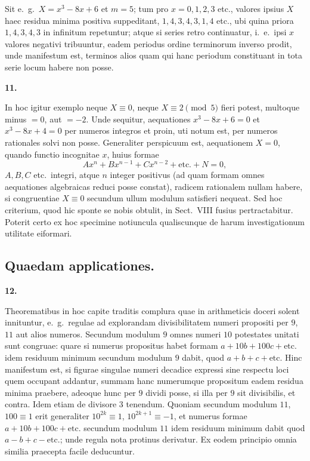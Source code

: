 \documentclass[12pt,a4paper]{article}
\theoremstyle{plain}
\theoremstyle{definition}
\theoremstyle{remark}
\begin{document}
Sit e.~g.\ $X = x^3 - 8x + 6$ et $m = 5$; tum pro $x = 0, 1, 2, 3$ etc., valores ipsius $X$ haec residua minima positiva suppeditant, $1, 4, 3, 4, 3, 1, 4$ etc., ubi quina priora $1, 4, 3, 4, 3$ in infinitum repetuntur; atque si series retro continuatur, i.~e.\ ipsi $x$ valores negativi tribuuntur, eadem periodus ordine terminorum inverso prodit, unde manifestum est, terminos alios quam qui hanc periodum constituant in tota serie locum habere non posse.

\textbf{11.}

In hoc igitur exemplo neque $X \equiv 0$, neque $X \equiv 2 \pmod{5}$ fieri potest, multoque minus $= 0$, aut $= -2$. Unde sequitur, aequationes $x^3 - 8x + 6 = 0$ et $x^3 - 8x + 4 = 0$ per numeros integros et proin, uti notum est, per numeros rationales solvi non posse. Generaliter perspicuum est, aequationem $X = 0$, quando functio incognitae $x$, huius formae
\[
Ax^n + Bx^{n-1} + Cx^{n-2} + \text{etc.} + N = 0,
\]
$A, B, C$ etc.\ integri, atque $n$ integer positivus (ad quam formam omnes aequationes algebraicas reduci posse constat), radicem rationalem nullam habere, si congruentiae $X \equiv 0$ secundum ullum modulum satisfieri nequeat. Sed hoc criterium, quod hic sponte se nobis obtulit, in Sect.~VIII fusius pertractabitur. Poterit certo ex hoc specimine notiuncula qualiscunque de harum investigationum utilitate eiformari.

\vspace{0.5em}
\subsection*{Quaedam applicationes.}

\textbf{12.}

Theorematibus in hoc capite traditis complura quae in arithmeticis doceri solent innituntur, e.~g.\ regulae ad explorandam divisibilitatem numeri propositi per $9$, $11$ aut alios numeros. Secundum modulum $9$ omnes numeri $10$ potestates unitati sunt congruae: quare si numerus propositus habet formam $a + 10b + 100c + \text{etc.}$ idem residuum minimum secundum modulum $9$ dabit, quod $a + b + c + \text{etc.}$ Hinc manifestum est, si figurae singulae numeri decadice expressi sine respectu loci quem occupant addantur, summam hanc numerumque propositum eadem residua minima praebere, adeoque hunc per $9$ dividi posse, si illa per $9$ sit divisibilis, et contra. Idem etiam de divisore $3$ tenendum. Quoniam secundum modulum $11$, $100 \equiv 1$ erit generaliter $10^{2k} \equiv 1$, $10^{2k+1} \equiv -1$, et numerus formae $a + 10b + 100c + \text{etc.}$ secundum modulum $11$ idem residuum minimum dabit quod $a - b + c - \text{etc.}$; unde regula nota protinus derivatur. Ex eodem principio omnia similia praecepta facile deducuntur.
\end{document}
